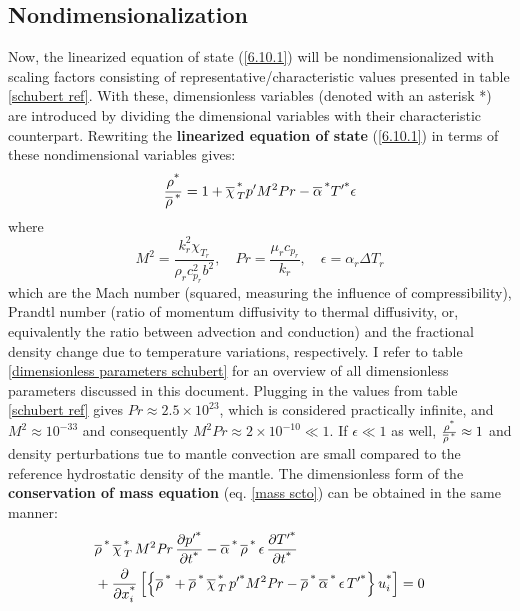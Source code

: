 \documentclass[document.tex]{subfiles}
\begin{document}
\subsection{Nondimensionalization}
Now, the linearized equation of state (\ref{6.10.1}) will be nondimensionalized with scaling factors consisting of 
representative/characteristic values presented in table \ref{schubert ref}. With these, dimensionless variables (denoted with 
an asterisk *) are introduced by dividing the dimensional variables with their characteristic counterpart. Rewriting the \textbf{linearized
equation of state} (\ref{6.10.1}) in terms of these nondimensional variables gives: 
\begin{align}
    \label{6.10.7}
    \frac{\rho^{\textup{*}}}{\overline{\rho}\,^{\textup{*}}} = 1 + \overline{\chi}\,_T^{\textup{*}}p' M^2 Pr - \overline{\alpha}\,^{\textup{*}} T'^{\textup{*}} \epsilon
\end{align}
where 
\begin{equation} %
    M^2 = \dfrac{k_r^2 \chi_{T_r}}{\rho_r c^2_{p_r} b^2}, \quad Pr = \frac{\mu_r c_{p_r}}{k_r}, \quad \epsilon = \alpha_r \Delta T_r
\end{equation}
which are the Mach number (squared, measuring the influence of compressibility), Prandtl number (ratio of momentum diffusivity to thermal diffusivity, or,
equivalently the ratio between advection and conduction) and the fractional density change due to temperature variations, respectively. 
I refer to table \ref{dimensionless parameters schubert}
for an overview of all dimensionless parameters discussed in this document. 
Plugging in the values from table \ref{schubert ref} gives $Pr \approx 2.5 \times 10^{23}$, which is considered practically infinite, and 
$M^2 \approx 10^{-33}$ and consequently $M^2Pr \approx 2 \times 10^{-10} \ll 1$. If $\epsilon \ll 1$ as well, $\frac{\rho^{\textup{*}}}{\overline{\rho}\,^{\textup{*}}} \approx 1$ and 
density perturbations tue to mantle convection are small compared to the reference hydrostatic density of the mantle. 
\newline
The dimensionless form of the \textbf{conservation of mass equation} (eq. \ref{mass scto}) can be obtained in the same manner: 
\begin{align}
    \label{eq:6.10.9}
  & \overline{\rho}\,^{\textup{*}}\,\overline{\chi}\,_{T}^{\textup{*}}\, M^2 \mathit{Pr}\,
    \pdv{\ensuremath p'^{\textup{*}}}{\ensuremath t^{\textup{*}}}
    - \overline{\alpha}\,^{\textup{*}}\,\overline{\rho}\,^{\textup{*}}\,\epsilon\,
    \pdv{\ensuremath T'^{\textup{*}}}{\ensuremath t^{\textup{*}}} \nonumber \\
  & + \pdv{\ensuremath x^{\textup{*}}_i}
    \left[ \left\{ \overline{\rho}\,^{\textup{*}}
    + \overline{\rho}\,^{\textup{*}}\,\overline{\chi}\,_{T}^{\textup{*}}\, p'^{\textup{*}} M^2 \mathit{Pr}
    - \overline{\rho}\,^{\textup{*}}\,\overline{\alpha}\,^{\textup{*}}\,\epsilon\, T'^{\textup{*}}
    \right\} u_i^{\textup{*}} \right]
    = 0
\end{align}
\end{document}
